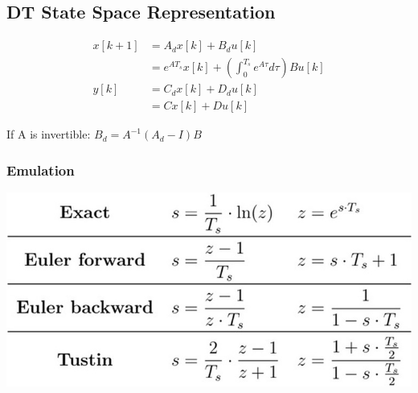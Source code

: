 \subsection{DT State Space Representation}
    \begin{align*}
        x[k+1] &= A_d x[k] + B_d u[k]\\
        &= e^{A T_s} x[k] + \left(\int_{0}^{T_s} e^{A \tau}d\tau\right)B u[k]\\
        y[k] &= C_d x[k] + D_d u[k]\\
        &= C x[k] + D u[k]
    \end{align*}

    \quad If A is invertible: $B_d = A^{-1}(A_d - I)B$

    \subsubsection{Emulation}
        \centerline{\includegraphics[width=0.8\linewidth]{src/1_discrete_time/images/emulation.jpeg}}